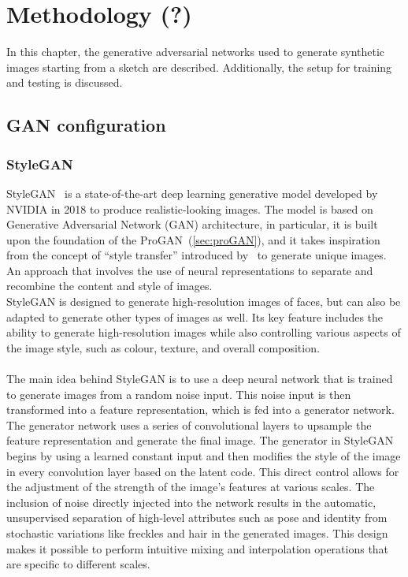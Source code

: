 \newpage
\section{Methodology (?)}
\label{sec:used GAN discussion}
In this chapter, the generative adversarial networks used to generate synthetic images starting from a sketch are described. Additionally, the setup for training and testing is discussed.
\subsection{GAN configuration}
\subsubsection{StyleGAN}
\label{section:StyleGAN}
StyleGAN~\cite{StyleGAN} is a state-of-the-art deep learning generative model developed by NVIDIA in 2018 to produce realistic-looking images. The model is based on Generative Adversarial Network (GAN) architecture, in particular, it is built upon the foundation of the ProGAN~(\ref{sec:proGAN}), and it takes inspiration from the concept of “style transfer” introduced by~\cite{ImageStyleTransfer} to generate unique images. An approach that involves the use of neural representations to separate and recombine the content and style of images. \\
StyleGAN is designed to generate high-resolution images of faces, but can also be adapted to generate other types of images as well. Its key feature includes the ability to generate high-resolution images while also controlling various aspects of the image style, such as colour, texture, and overall composition. \\ \\
The main idea behind StyleGAN is to use a deep neural network that is trained to generate images from a random noise input. This noise input is then transformed into a feature representation, which is fed into a generator network. The generator network uses a series of convolutional layers to upsample the feature representation and generate the final image. The generator in StyleGAN begins by using a learned constant input and then modifies the style of the image in every convolution layer based on the latent code. This direct control allows for the adjustment of the strength of the image's features at various scales. The inclusion of noise directly injected into the network results in the automatic, unsupervised separation of high-level attributes such as pose and identity from stochastic variations like freckles and hair in the generated images. This design makes it possible to perform intuitive mixing and interpolation operations that are specific to different scales.
